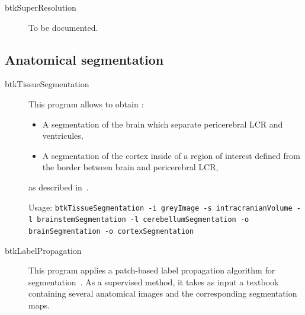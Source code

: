 \begin{description}
 \item[btkSuperResolution] To be documented. 

\end{description}

\subsection{Anatomical segmentation}
\label{subsec:ana_seg}

\begin{description}
 \item[btkTissueSegmentation] This program allows to obtain :
        \begin{itemize}
         \item A segmentation of the brain which separate pericerebral LCR and ventricules,
         \item A segmentation of the cortex inside of a region of interest defined from the border between brain and pericerebral LCR,
        \end{itemize}
        as described in~\cite{caldairou_segmentation_2011}.
        
        Usage: \texttt{btkTissueSegmentation -i greyImage -s intracranianVolume -l brainstemSegmentation -l cerebellumSegmentation -o brainSegmentation -o cortexSegmentation}
\end{description}

\begin{description}
 \item[btkLabelPropagation] This program applies a patch-based label propagation algorithm for segmentation~\cite{rousseau_supervised_2011}. As a supervised method, it takes as input a textbook containing several anatomical images and the corresponding segmentation maps.
\end{description}


